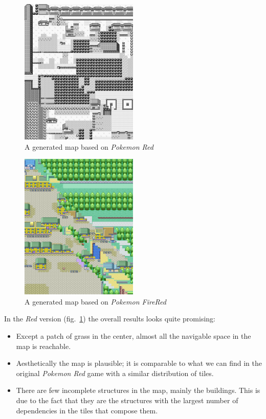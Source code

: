 \documentclass[A4paper,]{article}
\providecommand{\tightlist}{%
  \setlength{\itemsep}{0pt}\setlength{\parskip}{0pt}}
\begin{document}
\begin{figure}
\centering
\includegraphics[width=0.50000\textwidth]{../data/pokemon-red/generated/100n-3k/image/46.png}
\caption{A generated map based on \emph{Pokemon
Red}}\label{fig:red-result}
\end{figure}

\begin{figure}
\centering
\includegraphics[width=0.50000\textwidth]{../data/pokemon-firered/generated/250n-3k/image/35.png}
\caption{A generated map based on \emph{Pokemon
FireRed}}\label{fig:firered-result}
\end{figure}

In the \emph{Red} version (fig.~\ref{fig:red-result}) the overall
results looks quite promising:

\begin{itemize}
\tightlist
\item
  Except a patch of grass in the center, almost all the navigable space
  in the map is reachable.
\item
  Aesthetically the map is plausible; it is comparable to what we can
  find in the original \emph{Pokemon Red} game with a similar
  distribution of tiles.
\item
  There are few incomplete structures in the map, mainly the buildings.
  This is due to the fact that they are the structures with the largest
  number of dependencies in the tiles that compose them.
\end{itemize}
\end{document}
